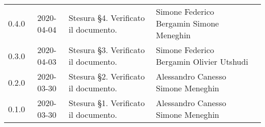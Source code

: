 {\begin{longtable}{ c c  C{4cm}  C{4cm}  C{3cm} }
		0.4.0 & 2020-04-04 & Stesura \S 4. Verificato il documento. & Simone Federico Bergamin \newline Simone Meneghin &\adm{} \newline \ver{}\\	
		0.3.0 & 2020-04-03 & Stesura \S 3. Verificato il documento.  & Simone Federico Bergamin \newline Olivier Utshudi &\adm{} \newline \ver{}\\	
		0.2.0 & 2020-03-30 & Stesura \S 2. Verificato il documento.  & Alessandro Canesso \newline Simone Meneghin &\Res{} \newline \ver{}\\	
		0.1.0 & 2020-03-30 & Stesura \S 1. Verificato il documento. & Alessandro Canesso \newline Simone Meneghin &\Res{} \newline \ver{}\\		
	\end{longtable}
} 
